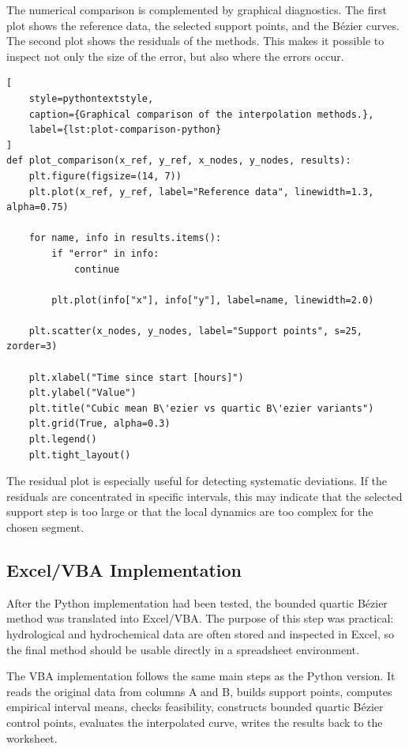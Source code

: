 \documentclass[12pt,a4paper]{article}
\begin{document}
The numerical comparison is complemented by graphical diagnostics. The first
plot shows the reference data, the selected support points, and the B\'ezier
curves. The second plot shows the residuals of the methods. This makes it
possible to inspect not only the size of the error, but also where the errors
occur.

\begin{lstlisting}[
    style=pythontextstyle,
    caption={Graphical comparison of the interpolation methods.},
    label={lst:plot-comparison-python}
]
def plot_comparison(x_ref, y_ref, x_nodes, y_nodes, results):
    plt.figure(figsize=(14, 7))
    plt.plot(x_ref, y_ref, label="Reference data", linewidth=1.3, alpha=0.75)

    for name, info in results.items():
        if "error" in info:
            continue

        plt.plot(info["x"], info["y"], label=name, linewidth=2.0)

    plt.scatter(x_nodes, y_nodes, label="Support points", s=25, zorder=3)

    plt.xlabel("Time since start [hours]")
    plt.ylabel("Value")
    plt.title("Cubic mean B\'ezier vs quartic B\'ezier variants")
    plt.grid(True, alpha=0.3)
    plt.legend()
    plt.tight_layout()
\end{lstlisting}

The residual plot is especially useful for detecting systematic deviations.
If the residuals are concentrated in specific intervals, this may indicate
that the selected support step is too large or that the local dynamics are
too complex for the chosen segment.

\subsection{Excel/VBA Implementation}

After the Python implementation had been tested, the bounded quartic B\'ezier method was translated into Excel/VBA. The purpose of this step was practical: hydrological and hydrochemical data are often stored and inspected in Excel, so the final method should be usable directly in a spreadsheet environment.

The VBA implementation follows the same main steps as the Python version. It reads the original data from columns A and B, builds support points, computes empirical interval means, checks feasibility, constructs bounded quartic B\'ezier control points, evaluates the interpolated curve, writes the results back to the worksheet.
\end{document}
